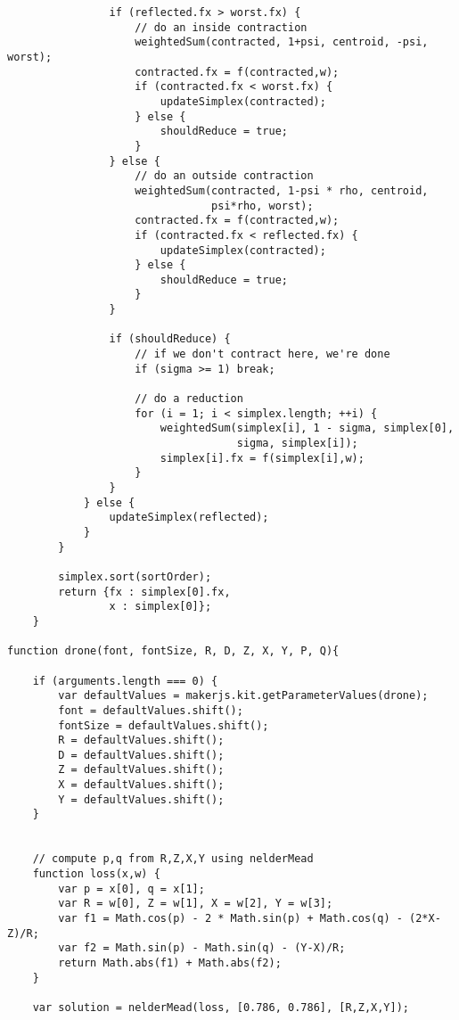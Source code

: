 \documentclass[11pt]{article}
\begin{document}
\begin{lstlisting}
                if (reflected.fx > worst.fx) {
                    // do an inside contraction
                    weightedSum(contracted, 1+psi, centroid, -psi, worst);
                    contracted.fx = f(contracted,w);
                    if (contracted.fx < worst.fx) {
                        updateSimplex(contracted);
                    } else {
                        shouldReduce = true;
                    }
                } else {
                    // do an outside contraction
                    weightedSum(contracted, 1-psi * rho, centroid,
                                psi*rho, worst);
                    contracted.fx = f(contracted,w);
                    if (contracted.fx < reflected.fx) {
                        updateSimplex(contracted);
                    } else {
                        shouldReduce = true;
                    }
                }

                if (shouldReduce) {
                    // if we don't contract here, we're done
                    if (sigma >= 1) break;

                    // do a reduction
                    for (i = 1; i < simplex.length; ++i) {
                        weightedSum(simplex[i], 1 - sigma, simplex[0],
                                    sigma, simplex[i]);
                        simplex[i].fx = f(simplex[i],w);
                    }
                }
            } else {
                updateSimplex(reflected);
            }
        }

        simplex.sort(sortOrder);
        return {fx : simplex[0].fx,
                x : simplex[0]};
    }

function drone(font, fontSize, R, D, Z, X, Y, P, Q){
    
    if (arguments.length === 0) {
        var defaultValues = makerjs.kit.getParameterValues(drone);
        font = defaultValues.shift();
        fontSize = defaultValues.shift();
        R = defaultValues.shift();
        D = defaultValues.shift();
        Z = defaultValues.shift();
        X = defaultValues.shift();
        Y = defaultValues.shift();
    }
    

    // compute p,q from R,Z,X,Y using nelderMead
    function loss(x,w) {
        var p = x[0], q = x[1];
        var R = w[0], Z = w[1], X = w[2], Y = w[3];
        var f1 = Math.cos(p) - 2 * Math.sin(p) + Math.cos(q) - (2*X-Z)/R;
        var f2 = Math.sin(p) - Math.sin(q) - (Y-X)/R;
        return Math.abs(f1) + Math.abs(f2);
    }

    var solution = nelderMead(loss, [0.786, 0.786], [R,Z,X,Y]);
     

\end{lstlisting}
\end{document}
